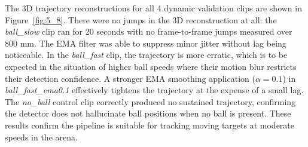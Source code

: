 The 3D trajectory reconstructions for all 4 dynamic validation clips are shown in Figure~\ref{fig:5_8}. There were no jumps in the 3D reconstruction at all: the \textit{ball\_slow} clip ran for 20 seconds with no frame-to-frame jumps measured over 800 mm. The EMA filter was able to suppress minor jitter without lag being noticeable. In the \textit{ball\_fast} clip, the trajectory is more erratic, which is to be expected in the situation of higher ball speeds where their motion blur restricts their detection confidence. A stronger EMA smoothing application ($\alpha = 0.1$) in \textit{ball\_fast\_ema0.1} effectively tightens the trajectory at the expense of a small lag. The \textit{no\_ball} control clip correctly produced no sustained trajectory, confirming the detector does not hallucinate ball positions when no ball is present. These results confirm the pipeline is suitable for tracking moving targets at moderate speeds in the arena.

